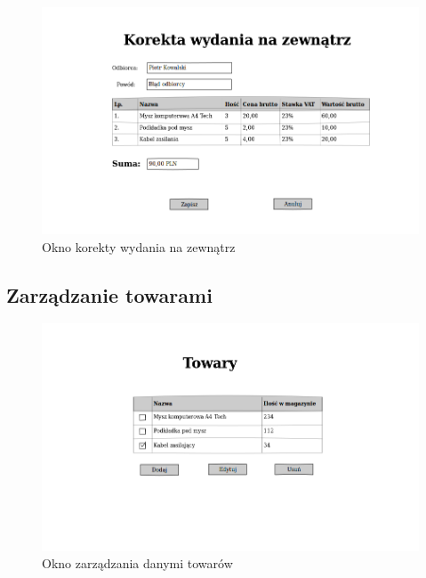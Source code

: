 \begin{figure}[!htb]
  \begin{center}
    \includegraphics[scale=0.45]{../img/interfejs/korekta-wydania-na-zewnatrz.png}
  \end{center}
  \caption{Okno korekty wydania na zewnątrz}
\end{figure}
\FloatBarrier

\subsection{Zarządzanie towarami}

\begin{figure}[!htb]
  \begin{center}
    \includegraphics[scale=0.45]{../img/interfejs/zarzadzanie-towarami.png}
  \end{center}
  \caption{Okno zarządzania danymi towarów}
\end{figure}
\FloatBarrier

